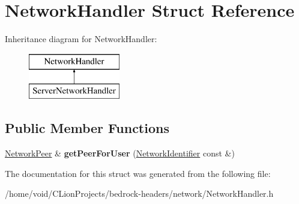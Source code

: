 \hypertarget{struct_network_handler}{}\section{Network\+Handler Struct Reference}
\label{struct_network_handler}
Inheritance diagram for Network\+Handler\+:\begin{figure}[H]
\begin{center}
\leavevmode
\includegraphics[height=2.000000cm]{struct_network_handler}
\end{center}
\end{figure}
\subsection*{Public Member Functions}
\begin{DoxyCompactItemize}
\item 
\mbox{\label{struct_network_handler_aa5420bc8a0237fa83516bcd73061b77f}} 
\mbox{\hyperlink{struct_network_peer}{Network\+Peer}} \& {\bfseries get\+Peer\+For\+User} (\mbox{\hyperlink{struct_network_identifier}{Network\+Identifier}} const \&)
\end{DoxyCompactItemize}


The documentation for this struct was generated from the following file\+:\begin{DoxyCompactItemize}
\item 
/home/void/\+C\+Lion\+Projects/bedrock-\/headers/network/Network\+Handler.\+h\end{DoxyCompactItemize}
